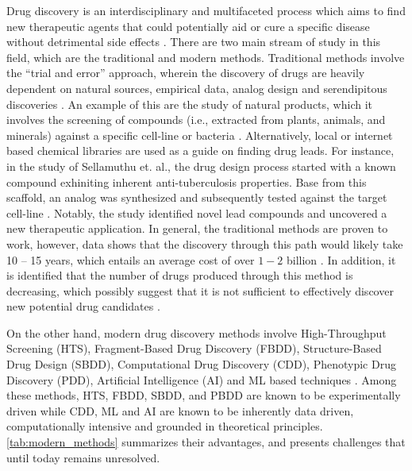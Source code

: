 \setlength{\parindent}{0pt}

Drug discovery is an interdisciplinary and multifaceted process which aims to find new therapeutic agents that could potentially aid or cure a specific disease without detrimental side effects \cite{araujo2018interdisciplinarity}. There are two main stream of study in this field, which are the traditional and modern methods. Traditional methods involve the “trial and error” approach, wherein the discovery of drugs are heavily dependent on natural sources, empirical data, analog design and serendipitous discoveries \cite{article}. An example of this are the study of natural products, which it involves the screening of compounds (i.e., extracted from plants, animals, and minerals) against a specific cell-line or bacteria \cite{ijms19061578}. Alternatively, local or internet based chemical libraries are used as a guide on finding drug leads. For instance, in the study of Sellamuthu et. al., the drug design process started with a known compound exhiniting inherent anti-tuberculosis properties. Base from this scaffold, an analog was synthesized and subsequently tested against the target cell-line \cite{sellamuthu2023analog}. Notably, the study identified novel lead compounds and uncovered a new therapeutic application. In general, the traditional methods are proven to work, however, data shows that the discovery through this path would likely take 10 – 15 years, which entails an average cost of over $1-2$ billion \cite{sun202290}. In addition, it is identified that the number of drugs produced through this method is decreasing, which possibly suggest that it is not sufficient to effectively discover new potential drug candidates \cite{pinzi2024drug}.  

On the other hand, modern drug discovery methods involve High-Throughput Screening (HTS), Fragment-Based Drug Discovery (FBDD), Structure-Based Drug Design (SBDD), Computational Drug Discovery (CDD), Phenotypic Drug Discovery (PDD), Artificial Intelligence (AI) and ML based techniques \cite{article}. 
Among these methods, HTS, FBDD, SBDD, and PBDD are known to be experimentally driven while CDD, ML and AI are known to be inherently data driven, computationally intensive and grounded in theoretical principles. \autoref{tab:modern_methods} summarizes their advantages, and presents challenges that until today remains unresolved.  

